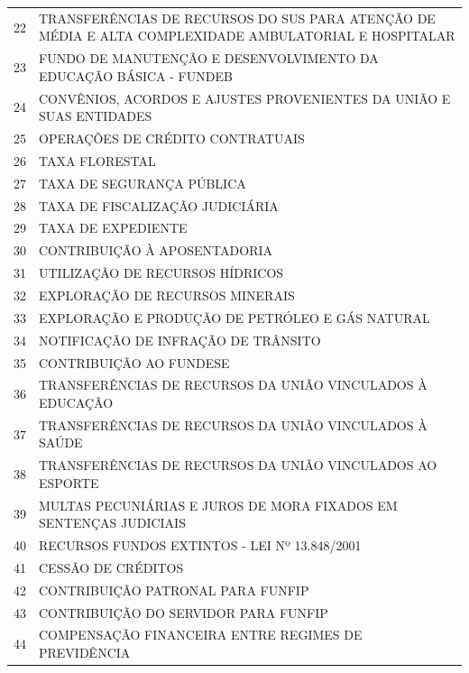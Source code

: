 \documentclass{article}
\begin{document}
\begin{longtable}[c]{m{1cm}|m{11cm}}
\multicolumn{1}{c|}{ 22 } & TRANSFERÊNCIAS DE RECURSOS DO SUS PARA ATENÇÃO DE MÉDIA E ALTA COMPLEXIDADE AMBULATORIAL E HOSPITALAR \\
\multicolumn{1}{c|}{ 23 } & FUNDO DE MANUTENÇÃO E DESENVOLVIMENTO DA EDUCAÇÃO BÁSICA - FUNDEB \\
\multicolumn{1}{c|}{ 24 } & CONVÊNIOS, ACORDOS E AJUSTES PROVENIENTES DA UNIÃO E SUAS ENTIDADES \\
\multicolumn{1}{c|}{ 25 } & OPERAÇÕES DE CRÉDITO CONTRATUAIS \\
\multicolumn{1}{c|}{ 26 } & TAXA FLORESTAL \\
\multicolumn{1}{c|}{ 27 } & TAXA DE SEGURANÇA PÚBLICA \\
\multicolumn{1}{c|}{ 28 } & TAXA DE FISCALIZAÇÃO JUDICIÁRIA \\
\multicolumn{1}{c|}{ 29 } & TAXA DE EXPEDIENTE \\
\multicolumn{1}{c|}{ 30 } & CONTRIBUIÇÃO À APOSENTADORIA \\
\multicolumn{1}{c|}{ 31 } & UTILIZAÇÃO DE RECURSOS HÍDRICOS \\
\multicolumn{1}{c|}{ 32 } & EXPLORAÇÃO DE RECURSOS MINERAIS \\
\multicolumn{1}{c|}{ 33 } & EXPLORAÇÃO E PRODUÇÃO DE PETRÓLEO E GÁS NATURAL \\
\multicolumn{1}{c|}{ 34 } & NOTIFICAÇÃO DE INFRAÇÃO DE TRÂNSITO \\
\multicolumn{1}{c|}{ 35 } & CONTRIBUIÇÃO AO FUNDESE \\
\multicolumn{1}{c|}{ 36 } & TRANSFERÊNCIAS DE RECURSOS DA UNIÃO VINCULADOS À EDUCAÇÃO \\
\multicolumn{1}{c|}{ 37 } & TRANSFERÊNCIAS DE RECURSOS DA UNIÃO VINCULADOS À SAÚDE \\
\multicolumn{1}{c|}{ 38 } & TRANSFERÊNCIAS DE RECURSOS DA UNIÃO VINCULADOS AO ESPORTE \\
\multicolumn{1}{c|}{ 39 } & MULTAS PECUNIÁRIAS E JUROS DE MORA FIXADOS EM SENTENÇAS JUDICIAIS \\
\multicolumn{1}{c|}{ 40 } & RECURSOS FUNDOS EXTINTOS - LEI Nº 13.848/2001 \\
\multicolumn{1}{c|}{ 41 } & CESSÃO DE CRÉDITOS \\
\multicolumn{1}{c|}{ 42 } & CONTRIBUIÇÃO PATRONAL PARA FUNFIP \\
\multicolumn{1}{c|}{ 43 } & CONTRIBUIÇÃO DO SERVIDOR PARA FUNFIP \\
\multicolumn{1}{c|}{ 44 } & COMPENSAÇÃO FINANCEIRA ENTRE REGIMES DE PREVIDÊNCIA \\

\end{longtable}
\end{document}
